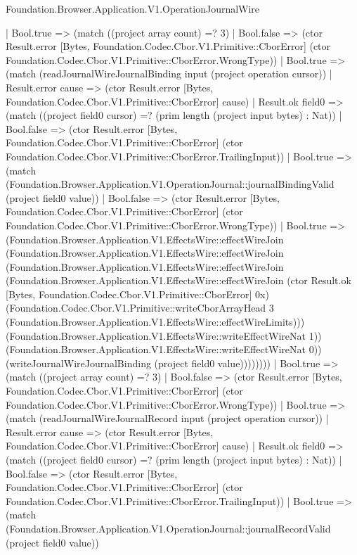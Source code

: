 \begin{lexlean}{Foundation.Browser.Application.V1.OperationJournalWire}
\begin{semanticmodule}
{                  | Bool.true => (match ((project array count) =? 3)
                    | Bool.false => (ctor Result.error [Bytes, Foundation.Codec.Cbor.V1.Primitive::CborError] (ctor Foundation.Codec.Cbor.V1.Primitive::CborError.WrongType))
                    | Bool.true => (match (readJournalWireJournalBinding input (project operation cursor))
                      | Result.error cause => (ctor Result.error [Bytes, Foundation.Codec.Cbor.V1.Primitive::CborError] cause)
                      | Result.ok field0 => (match ((project field0 cursor) =? (prim length (project input bytes) : Nat))
                        | Bool.false => (ctor Result.error [Bytes, Foundation.Codec.Cbor.V1.Primitive::CborError] (ctor Foundation.Codec.Cbor.V1.Primitive::CborError.TrailingInput))
                        | Bool.true => (match (Foundation.Browser.Application.V1.OperationJournal::journalBindingValid (project field0 value))
                          | Bool.false => (ctor Result.error [Bytes, Foundation.Codec.Cbor.V1.Primitive::CborError] (ctor Foundation.Codec.Cbor.V1.Primitive::CborError.WrongType))
                          | Bool.true => (Foundation.Browser.Application.V1.EffectsWire::effectWireJoin (Foundation.Browser.Application.V1.EffectsWire::effectWireJoin (Foundation.Browser.Application.V1.EffectsWire::effectWireJoin (Foundation.Browser.Application.V1.EffectsWire::effectWireJoin (ctor Result.ok [Bytes, Foundation.Codec.Cbor.V1.Primitive::CborError] 0x) (Foundation.Codec.Cbor.V1.Primitive::writeCborArrayHead 3 (Foundation.Browser.Application.V1.EffectsWire::effectWireLimits))) (Foundation.Browser.Application.V1.EffectsWire::writeEffectWireNat 1)) (Foundation.Browser.Application.V1.EffectsWire::writeEffectWireNat 0)) (writeJournalWireJournalBinding (project field0 value))))))))
                | Bool.true => (match ((project array count) =? 3)
                  | Bool.false => (ctor Result.error [Bytes, Foundation.Codec.Cbor.V1.Primitive::CborError] (ctor Foundation.Codec.Cbor.V1.Primitive::CborError.WrongType))
                  | Bool.true => (match (readJournalWireJournalRecord input (project operation cursor))
                    | Result.error cause => (ctor Result.error [Bytes, Foundation.Codec.Cbor.V1.Primitive::CborError] cause)
                    | Result.ok field0 => (match ((project field0 cursor) =? (prim length (project input bytes) : Nat))
                      | Bool.false => (ctor Result.error [Bytes, Foundation.Codec.Cbor.V1.Primitive::CborError] (ctor Foundation.Codec.Cbor.V1.Primitive::CborError.TrailingInput))
                      | Bool.true => (match (Foundation.Browser.Application.V1.OperationJournal::journalRecordValid (project field0 value))
}
\end{semanticmodule}
\end{lexlean}
